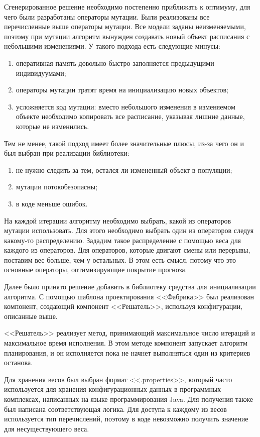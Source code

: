 \documentclass[times,specification,annotation]{itmo-student-thesis}
\begin{document}
Сгенерированное решение необходимо постепенно приближать к оптимуму, для чего были разработаны операторы мутации.
Были реализованы все перечисленные выше операторы мутации.
Все модели заданы неизменяемыми, поэтому при мутации алгоритм вынужден создавать новый объект расписания с небольшими изменениями.
У такого подхода есть следующие минусы:

\begin{enumerate}
    \item оперативная память довольно быстро заполняется предыдущими индивидуумами;
    \item операторы мутации тратят время на инициализацию новых объектов;
    \item усложняется код мутации: вместо небольшого изменения в изменяемом объекте необходимо копировать все расписание, указывая лишние данные, которые не изменились.
\end{enumerate}

Тем не менее, такой подход имеет более значительные плюсы, из-за чего он и был выбран при реализации библиотеки:

\begin{enumerate}
    \item не нужно следить за тем, остался ли измененный объект в популяции;
    \item мутации потокобезопасны;
    \item в коде меньше ошибок.
\end{enumerate}

На каждой итерации алгоритму необходимо выбрать, какой из операторов мутации использовать.
Для этого необходимо выбрать один из операторов следуя какому-то распределению.
Зададим такое распределение с помощью веса для каждого из операторов.
Для операторов, которые двигают смены или перерывы, поставим вес больше, чем у остальных.
В этом есть смысл, потому что это основные операторы, оптимизирующие покрытие прогноза.

Далее было принято решение добавить в библиотеку средства для инициализации алгоритма.
С помощью шаблона проектирования <<Фабрика>> был реализован компонент, создающий компонент <<Решатель>>, используя конфигурации, описанные выше.

<<Решатель>> реализует метод, принимающий максимальное число итераций и максимальное время исполнения.
В этом методе компонент запускает алгоритм планирования, и он исполняется пока не начнет выполняться один из критериев останова.

Для хранения весов был выбран формат <<.properties>>, который часто используется для хранения конфигурационных данных в программных комплексах, написанных на языке программирования Java.
Для получения также был написана соответствующая логика.
Для доступа к каждому из весов используется тип перечислений, поэтому в коде невозможно получить значение для несуществующего веса.
\end{document}
